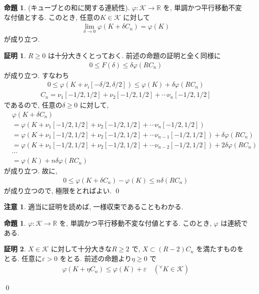 \documentclass[10pt, fleqn, label-section=none]{bxjsarticle}
\theoremstyle{definition}
\newtheorem{prop}[dfn]{命題}
\newtheorem*{pf*}{証明}
\newtheorem{remark}[dfn]{注意}
\newcommand{\any}{{}^{\forall}}
\newcommand{\veps}{\varepsilon}
\renewcommand{\;}{\, ; \,}
\begin{document}
\begin{prop}(キューブとの和に関する連続性). $\varphi : \mathcal K \rightarrow \mathbb R$ を, 単調かつ平行移動不変な付値とする. このとき, 任意の$K \in \mathcal K$ に対して
\begin{align*} \lim_{\delta \rightarrow 0} \varphi(K+ \delta C_n ) =  \varphi(K)   \end{align*}
が成り立つ. 

\end{prop}
\begin{pf*} $R \geq 0$ は十分大きくとっておく. 前述の命題の証明と全く同様に
\begin{align*} 0 \leq F(\delta ) \leq  \delta \varphi(RC_n) \end{align*}
が成り立つ. すなわち
\begin{align*} 0  \leq \varphi(K + \nu_i [- \delta /2 , \delta/2]) \leq \varphi(K) + \delta \varphi(R C_n) \end{align*}
\begin{align*} C_n = \nu_1 [-1/2, 1/2] + \nu_2 [- 1/2, 1/2] + \cdots \nu_n [-1/2, 1/2] \end{align*}
であるので, 任意の$\delta \geq  0$ に対して, 
\begin{align*} &\varphi (K + \delta C_n) \\&= \varphi(K + \nu_1 [-1/2, 1/2] + \nu_2 [- 1/2, 1/2] + \cdots \nu_n [-1/2, 1/2] ) \\&= \varphi(K + \nu_1 [-1/2, 1/2] + \nu_2 [- 1/2, 1/2] +\cdots \nu_{n-1} [-1/2, 1/2] ) +  \delta \varphi(RC_n) 
\\& = \varphi(K + \nu_1 [-1/2, 1/2] + \nu_2 [- 1/2, 1/2] +\cdots \nu_{n-2} [-1/2, 1/2] ) + 2 \delta \varphi(RC_n) 
\\& \cdots 
\\& = \varphi(K) + n  \delta \varphi(RC_n)
 \end{align*}
 が成り立つ. 
 故に, 
 \begin{align*} 0 \leq \varphi(K + \delta C_n) - \varphi(K) \leq n\delta (RC_n)  \end{align*}
 が成り立つので, 極限をとればよい. 
\qed
\end{pf*}

\begin{remark}
適当に証明を読めば, 一様収束であることもわかる. 
\end{remark}


\begin{prop}$\varphi : \mathcal K \rightarrow \mathbb R$ を, 単調かつ平行移動不変な付値とする. 
このとき, $\varphi$ は連続である. 
\end{prop}
\begin{pf*}$X \in \mathcal K$ に対して十分大きな$R \geq 2$ で, $X \subset (R - 2)C_n$ を満たすものをとる. 任意に$\veps > 0$ をとる. 前述の命題より$\eta \geq 0$ で
\begin{align*} \varphi(K + \eta C_n) \leq \varphi(K) + \veps \quad ( \any K \in \mathcal K) \end{align*}

\qed
\end{pf*}
\end{document}
